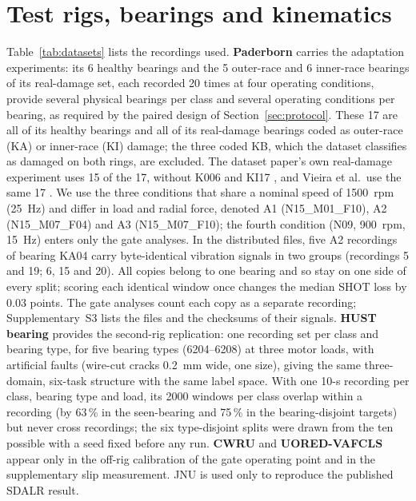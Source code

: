 \section{Test rigs, bearings and kinematics}
\label{sec:data}



Table~\ref{tab:datasets} lists the recordings used. \textbf{Paderborn} \cite{lessmeier2016} carries the adaptation
experiments: its 6 healthy bearings and the 5 outer-race and 6 inner-race bearings of its real-damage set, each recorded 20
times at four operating conditions, provide several physical bearings per class and several operating conditions per bearing, as required by the paired design of Section~\ref{sec:protocol}. These 17 are all of its healthy bearings and all of its real-damage bearings coded as outer-race (KA) or inner-race (KI) damage; the three coded KB, which the dataset classifies as damaged on both rings, are excluded. The dataset paper's own real-damage experiment uses 15 of the 17, without K006 and KI17 \cite[Table~10]{lessmeier2016}, and Vieira et al.\ use the same 17 \cite{vieira2026}. We use the
three conditions that share a nominal speed of \SI{1500}{rpm} (\SI{25}{Hz}) and differ in load and radial force, denoted A1
(N15\_M01\_F10), A2 (N15\_M07\_F04) and A3 (N15\_M07\_F10); the fourth condition (N09, \SI{900}{rpm}, \SI{15}{Hz}) enters
only the gate analyses. In the distributed files, five A2 recordings of bearing KA04 carry byte-identical vibration signals in two groups (recordings 5 and 19; 6, 15 and 20). All copies belong to one bearing and so stay on one side of every split; scoring each identical window once changes the median SHOT loss by 0.03 points. The gate analyses count each copy as a separate recording; Supplementary~S3 lists the files and the checksums of their signals.
\textbf{HUST bearing} \cite{thuan2023hust} provides the second-rig replication: one recording set per class and bearing type, for
five bearing types (6204--6208) at three motor loads, with artificial faults (wire-cut cracks \SI{0.2}{mm} wide, one size), giving the same three-domain, six-task structure with the same label
space. With one 10-s recording per class, bearing type and load, its 2000 windows per class overlap within a recording
(by 63\,\% in the seen-bearing and 75\,\% in the bearing-disjoint targets) but never cross recordings; the six
type-disjoint splits were drawn from the ten possible with a seed fixed before any run. \textbf{CWRU} \cite{cwrubdc,smith2015} and \textbf{UORED-VAFCLS} \cite{sehri2023uored} appear only in the off-rig calibration of the
gate operating point and in the supplementary slip measurement. JNU \cite{li2013jnu} is used only to reproduce the published SDALR result.

